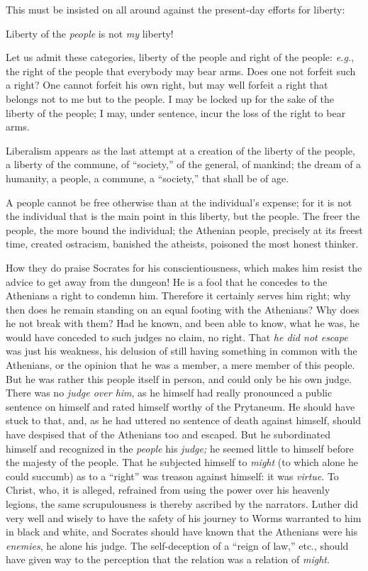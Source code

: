 This must be insisted on all around against the present-day efforts for 
liberty:

Liberty of the \textit{people} is not \textit{my} liberty!

Let us admit these categories, liberty of the people and right of the people: 
\textit{e.g.}, the right of the people that everybody may bear arms. Does one 
not forfeit such a right? One cannot forfeit his own right, but may well 
forfeit a right that belongs not to me but to the people. I may be locked up 
for the sake of the liberty of the people; I may, under sentence, incur the 
loss of the right to bear arms.

Liberalism appears as the last attempt at a creation of the liberty of the 
people, a liberty of the commune, of ``society,'' of the general, of 
mankind; the dream of a humanity, a people, a commune, a ``society,'' that 
shall be of age.

A people cannot be free otherwise than at the individual's expense; for it is 
not the individual that is the main point in this liberty, but the people. The 
freer the people, the more bound the individual; the Athenian people, 
precisely at its freest time, created ostracism, banished the atheists, 
poisoned the most honest thinker.

How they do praise Socrates for his conscientiousness, which makes him resist 
the advice to get away from the dungeon! He is a fool that he concedes to the 
Athenians a right to condemn him. Therefore it certainly serves him right; why 
then does he remain standing on an equal footing with the Athenians? Why does 
he not break with them? Had he known, and been able to know, what he was, he 
would have conceded to such judges no claim, no right. That \textit{he did not 
escape} was just his weakness, his delusion of still having something in 
common with the Athenians, or the opinion that he was a member, a mere member 
of this people. But he was rather this people itself in person, and could only 
be his own judge. There was no \textit{judge over him}, as he himself had 
really pronounced a public sentence on himself and rated himself worthy of the 
Prytaneum. He should have stuck to that, and, as he had uttered no sentence of 
death against himself, should have despised that of the Athenians too and 
escaped. But he subordinated himself and recognized in the \textit{people} his 
\textit{judge;} he seemed little to himself before the majesty of the people. 
That he subjected himself to \textit{might} (to which alone he could succumb) 
as to a ``right'' was treason against himself: it was \textit{virtue}. To 
Christ, who, it is alleged, refrained from using the power over his heavenly 
legions, the same scrupulousness is thereby ascribed by the narrators. Luther 
did very well and wisely to have the safety of his journey to Worms warranted 
to him in black and white, and Socrates should have known that the Athenians 
were his \textit{enemies}, he alone his judge. The self-deception of a 
``reign of law,'' etc., should have given way to the perception that the 
relation was a relation of \textit{might}.

